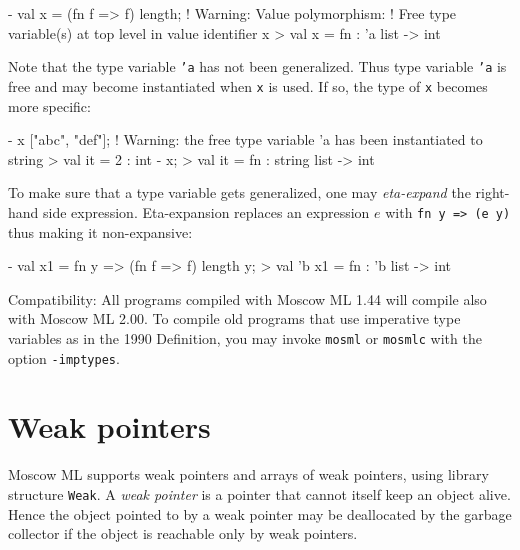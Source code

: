 \documentclass[fleqn]{article}
\begin{document}
\begin{program}
- val x = (fn f => f) length;
! Warning: Value polymorphism: 
! Free type variable(s) at top level in value identifier x
> val x = fn : 'a list -> int
\end{program}

\noindent Note that the type variable \texttt{'a} has not been
generalized.  Thus type variable \texttt{'a} is free and may become
instantiated when \texttt{x} is used.  If so, the type of \texttt{x}
becomes more specific:

\begin{program}
- x ["abc", "def"];
! Warning: the free type variable 'a has been instantiated to string
> val it = 2 : int
- x;
> val it = fn : string list -> int
\end{program}

\noindent To make sure that a type variable gets generalized, one may {\em
  eta-expand\/} the right-hand side expression.  Eta-expansion
replaces an expression $e$ with \texttt{fn y => (e y)} thus making it
non-expansive:

\begin{program}
- val x1 = fn y => (fn f => f) length y;
> val 'b x1 = fn : 'b list -> int
\end{program}

\noindent Compatibility: All programs compiled with Moscow ML 1.44
will compile also with Moscow ML 2.00\@.  To compile old programs that
use imperative type variables as in the 1990 Definition, you may
invoke {\tt mosml} or {\tt mosmlc} with the option {\tt -imptypes}.


\newpage


\section{Weak pointers}
\label{sec-weak-pointers}

Moscow ML supports weak pointers and arrays of weak pointers, using
library structure {\tt Weak}.  A {\em weak pointer\/} is a pointer
that cannot itself keep an object alive.  Hence the object pointed to
by a weak pointer may be deallocated by the garbage collector if the
object is reachable only by weak pointers.
\end{document}
